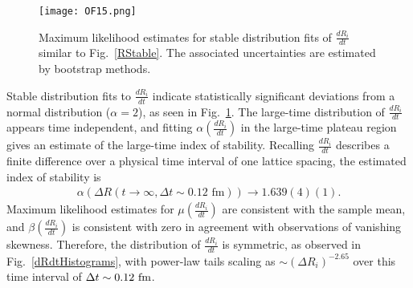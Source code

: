 \begin{figure}[!ht]
  \centering
  \texttt{[image: OF15.png]}
  \caption{
  Maximum likelihood estimates for stable distribution fits of $\frac{dR_i}{dt}$ similar to Fig.~\ref{RStable}.
  The associated uncertainties are estimated by bootstrap methods.
}
  \label{dRdtStable}
\end{figure}
%
Stable distribution fits to $\frac{dR_i}{dt}$ indicate statistically significant deviations from a normal distribution ($\alpha=2$), 
as seen in Fig.~\ref{dRdtStable}.
 The large-time distribution of $\frac{dR_i}{dt}$ appears time independent, and fitting $\alpha\left( \frac{dR_i}{dt} \right)$ in the large-time plateau region gives an estimate of the large-time index of stability. Recalling $\frac{dR_i}{dt}$ describes a finite difference over a physical time interval of one lattice spacing, the estimated index of stability is
\begin{equation}
  \begin{split}
    \alpha\left( \Delta R(t\rightarrow \infty, \Delta t \sim 0.12\text{ fm}) \right) \rightarrow 1.639(4)(1).
  \end{split}
  \label{alphaDeltaR}
\end{equation}
%
Maximum likelihood estimates for $\mu\left( \frac{dR_i}{dt} \right)$ are consistent with the sample mean, and $\beta\left( \frac{dR_i}{dt} \right)$ is consistent with zero in agreement with observations of vanishing skewness.
Therefore,  the distribution of $ \frac{dR_i}{dt}$ is symmetric, as observed in Fig.~\ref{dRdtHistograms}, with power-law tails scaling as 
$\sim \left(\Delta R_i\right)^{-2.65}$ over this time interval of $\Delta t\sim 0.12~{\rm fm}$.



